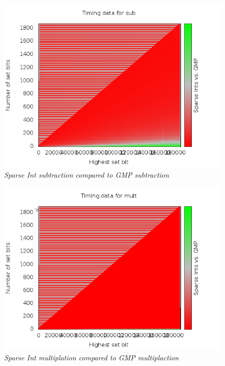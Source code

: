 \documentclass[letterpaper,11pt]{article}
\begin{document}
\begin{figure}  
\begin{center}  
\includegraphics[width=.8\textwidth]{../plots/sub5num1000high3test.png}  
\caption{\small \sl Sparse Int subtraction compared to GMP subtraction\label{fig:Subtraction}}  
\end{center}  
\end{figure} 

\begin{figure}  
\begin{center}  
\includegraphics[width=.8\textwidth]{../plots/mult5num1000high3test.png}  
\caption{\small \sl Sparse Int multiplation compared to GMP multiplaction\label{fig:Multiplaction}}  
\end{center}  
\end{figure} 
\end{document}
